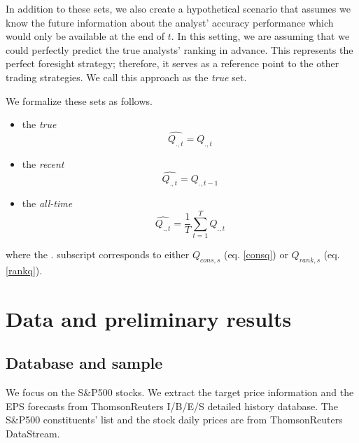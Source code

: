 \documentclass{article}\usepackage[]{graphicx}\usepackage[]{color}
\newcommand{\tr}{\textit{true}}
\newcommand{\naive}{\textit{recent}}
\newcommand{\default}{\textit{all-time}}
\begin{document}
In addition to these sets,  we also create a hypothetical scenario that assumes we know the future information about the analyst' accuracy performance which would only be available at the end of $t$. In this setting, we are assuming that we could  perfectly predict the true analysts' ranking in advance. This represents the perfect foresight strategy; therefore, it serves as a reference point to the other trading strategies. We call this approach as the \tr{} set. 

We formalize these sets as follows. 
\begin{itemize}
\item  the \tr{} %
\begin{equation}
\label{q:true}
\widehat{Q_{.,t}}=Q_{.,t}
\end{equation}

\item  the \naive{} %
\begin{equation}
\label{q:naive}
\widehat{Q_{.,t}}=Q_{.,t-1}
\end{equation}

\item  the \default{} %
\begin{equation}
\label{q:default}
\widehat{Q_{.,t}} = \frac{1}{T} \sum_{t=1}^{T} Q_{.,t}
\end{equation}
\end{itemize}
where the $.$ subscript corresponds to either $Q_{cons,s}$ (eq. \ref{consq}) or $Q_{rank,s}$ (eq. \ref{rankq}).




\section{Data and preliminary results}
\label{sec:rankings}

\subsection{Database and sample}
We focus on the  S\&P500 stocks. We extract the target price information and the EPS forecasts from ThomsonReuters  I/B/E/S detailed history database. The  S\&P500 constituents' list and the stock daily prices are from ThomsonReuters DataStream.
\end{document}
